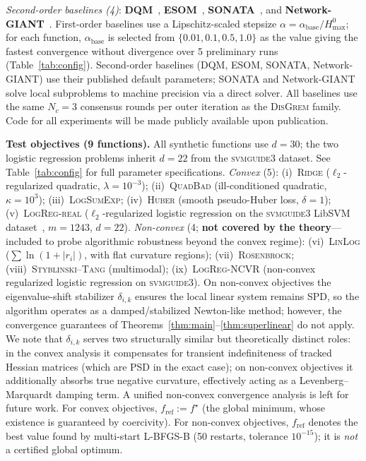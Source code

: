 \documentclass[10pt,twocolumn,letterpaper]{article}
\theoremstyle{compact}
\theoremstyle{compactremark}
\begin{document}
	\noindent\textit{Second-order baselines (4)}:
	\textbf{DQM}~\citep{eisen2017dqn},
	\textbf{ESOM}~\citep{mokhtari2016esom},
	\textbf{SONATA}~\citep{sun2022sonata}, and
	\textbf{Network-GIANT}~\citep{ye2023networkgiant}.
	First-order baselines use a Lipschitz-scaled stepsize
	$\alpha=\alpha_{\mathrm{base}}/H_{\max}^{0}$;
	for each function, $\alpha_{\mathrm{base}}$ is selected from
	$\{0.01, 0.1, 0.5, 1.0\}$ as the value giving the fastest
	convergence without divergence over 5 preliminary runs
	(Table~\ref{tab:config}).
	Second-order baselines (DQM, ESOM, SONATA, Network-GIANT) use their
	published default parameters; SONATA and Network-GIANT solve local
	subproblems to machine precision via a direct solver.
	All baselines use the same $N_c{=}3$ consensus rounds per outer
	iteration as the \textsc{DisGrem} family.
	Code for all experiments will be made publicly available upon
	publication.
	
	\noindent\textbf{Test objectives (9 functions).}
	All synthetic functions use $d{=}30$; the two logistic regression problems
	inherit $d{=}22$ from the \textsc{svmguide3} dataset.
	See Table~\ref{tab:config} for full parameter specifications.
	\textit{Convex} (5):
	(i)~\textsc{Ridge} ($\ell_2$-regularized quadratic, $\lambda{=}10^{-3}$);
	(ii)~\textsc{QuadBad} (ill-conditioned quadratic, $\kappa{=}10^3$);
	(iii)~\textsc{LogSumExp};
	(iv)~\textsc{Huber} (smooth pseudo-Huber loss, $\delta{=}1$);
	(v)~\textsc{LogReg-real} ($\ell_2$-regularized logistic regression on the
	\textsc{svmguide3} LibSVM dataset~\citep{chang2011libsvm}, $m{=}1243$, $d{=}22$).
	\textit{Non-convex} (4; \textbf{not covered by the theory}---included
	to probe algorithmic robustness beyond the convex regime):
	(vi)~\textsc{LinLog} ($\sum\ln(1{+}|r_i|)$, with flat curvature regions);
	(vii)~\textsc{Rosenbrock};
	(viii)~\textsc{Styblinski--Tang} (multimodal);
	(ix)~\textsc{LogReg-NCVR} (non-convex regularized logistic regression on
	\textsc{svmguide3}).
	On non-convex objectives the eigenvalue-shift stabilizer $\delta_{i,k}$
	ensures the local linear system remains SPD, so the algorithm operates
	as a damped/stabilized Newton-like method; however, the convergence
	guarantees of Theorems~\ref{thm:main}--\ref{thm:superlinear} do not apply.
	We note that $\delta_{i,k}$ serves two structurally similar but
	theoretically distinct roles:
	in the convex analysis it compensates for transient indefiniteness of
	tracked Hessian matrices (which are PSD in the exact case);
	on non-convex objectives it additionally absorbs true negative curvature,
	effectively acting as a Levenberg--Marquardt damping term.
	A unified non-convex convergence analysis is left for future work.
	For convex objectives, $f_{\mathrm{ref}}:=f^\star$ (the global minimum,
	whose existence is guaranteed by coercivity).
	For non-convex objectives, $f_{\mathrm{ref}}$ denotes the best value
	found by multi-start L-BFGS-B (50 restarts, tolerance $10^{-15}$);
	it is \emph{not} a certified global optimum.
	
\end{document}
